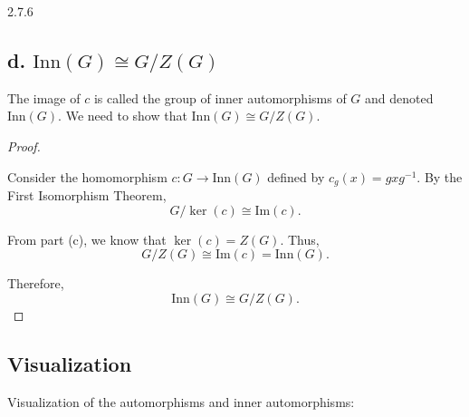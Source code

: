 \documentclass[12pt]{amsart}
\theoremstyle{definition}
\numberwithin{equation}{section}
\begin{document}
\begin{exercise}{2.7.6}
    \subsection*{d. \(\text{Inn}(G) \cong G/Z(G)\)}
    
    The image of \(c\) is called the group of inner automorphisms of \(G\) and denoted \(\text{Inn}(G)\). We need to show that \(\text{Inn}(G) \cong G / Z(G)\).
    
    \begin{proof} \( \)
    
    Consider the homomorphism \(c: G \rightarrow \text{Inn}(G)\) defined by \(c_g(x) = gxg^{-1}\). By the First Isomorphism Theorem,
    \[
    G / \ker(c) \cong \text{Im}(c).
    \]
    
    From part (c), we know that \(\ker(c) = Z(G)\). Thus,
    \[
    G / Z(G) \cong \text{Im}(c) = \text{Inn}(G).
    \]
    
    Therefore,
    \[
    \text{Inn}(G) \cong G / Z(G).
    \]
    
    \end{proof}

    \subsection*{Visualization}

    Visualization of the automorphisms and inner automorphisms:

    \begin{center}
    \end{center}
    
\end{exercise}
\newpage
\end{document}
